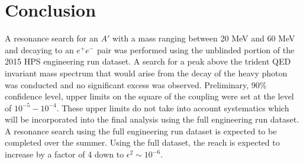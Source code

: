 
\chapter{Conclusion}

A resonance search for an $A'$ with a mass ranging between 20 MeV and 60
MeV and decaying to an $e^+e^-$ pair was performed using the unblinded
portion of the 2015 HPS engineering run dataset. A search for a peak above the 
trident QED invariant mass spectrum that would arise from the decay of the heavy 
photon was conducted and no significant excess
was observed.  Preliminary, 90\% confidence level,
upper limits on the square of the coupling were set at the level of $10^{-5} - 10^{-4}$. 
These upper limits
do not take into account systematics which will be incorporated into the final 
analysis using the full engineering run dataset.  A resonance search using the 
full engineering run dataset is expected to be completed over the summer. 
Using the full dataset, the reach is expected to increase by a factor of 
4 down to $\epsilon^2 \sim 10^{-6}$.



